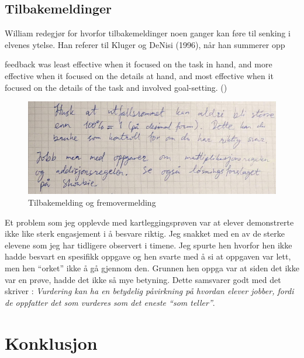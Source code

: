\documentclass[main.tex]{subfiles}
\begin{document}
\subsection*{Tilbakemeldinger}

William redegjør for hvorfor tilbakemeldinger noen ganger kan føre til senking 
i elvenes ytelse. Han referer til Kluger og DeNisi (1996), når han summerer opp 
\begin{displayquote}
\textelp{} feedback was least effective when it focused on the task in hand, 
and more effective when it focused on the details at hand, and most effective 
when it focused on the details of the task and involved goal-setting.
()
\end{displayquote}

\begin{figure}
\centering
\includegraphics[scale = 0.4]{../figures/mohsin2.png}
\caption{Tilbakemelding og fremovermelding}
\label{fig:mohsin2}
\end{figure}

Et problem som jeg opplevde med kartleggingsprøven var at elever demonstrerte ikke like sterk engasjement
i å besvare riktig. Jeg snakket med en av de sterke elevene som jeg har tidligere observert i timene.
Jeg spurte hen hvorfor hen ikke hadde besvart en spesifikk oppgave og hen svarte med å si at oppgaven 
var lett, men hen ``orket'' ikke å gå gjennom den. Grunnen hen oppga var at siden det ikke var en prøve,
hadde det ikke så mye betyning. Dette samsvarer godt med det  skriver : \emph{Vurdering 
kan ha en betydelig påvirkning på hvordan elever jobber, fordi de oppfatter det som vurderes som det eneste
``som teller''}.

\section*{Konklusjon}
\label{sec:6}
\end{document}
